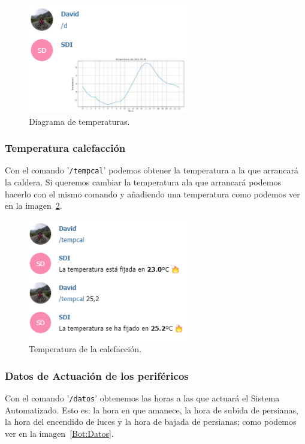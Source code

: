 \begin{figure}[h]
\centering
\includegraphics[width=0.64\textwidth]{img/SalidasBot/diagrama.PNG}
\caption{Diagrama de temperaturas.}\label{Bot:Diagrama}
\end{figure}

\subsubsection{Temperatura calefacción}
Con el comando '\texttt{/tempcal}' podemos obtener la temperatura a la que arrancará la caldera. Si queremos cambiar la temperatura ala que arrancará podemos hacerlo con el mismo comando y añadiendo una temperatura como podemos ver en la imagen~\ref{Bot:Calefaccion}.

\begin{figure}[h]
\centering
\includegraphics[width=0.64\textwidth]{img/SalidasBot/temperaturaCalefaccion.PNG}
\caption{Temperatura de la calefacción.}\label{Bot:Calefaccion}
\end{figure}


\subsubsection{Datos de Actuación de los periféricos}
Con el comando '\texttt{/datos}' obtenemos las horas a las que actuará el Sistema Automatizado. Esto es: la hora en que amanece, la hora de subida de persianas, la hora del encendido de luces y la hora de bajada de persianas; como podemos ver en la imagen~\ref{Bot:Datos}.

